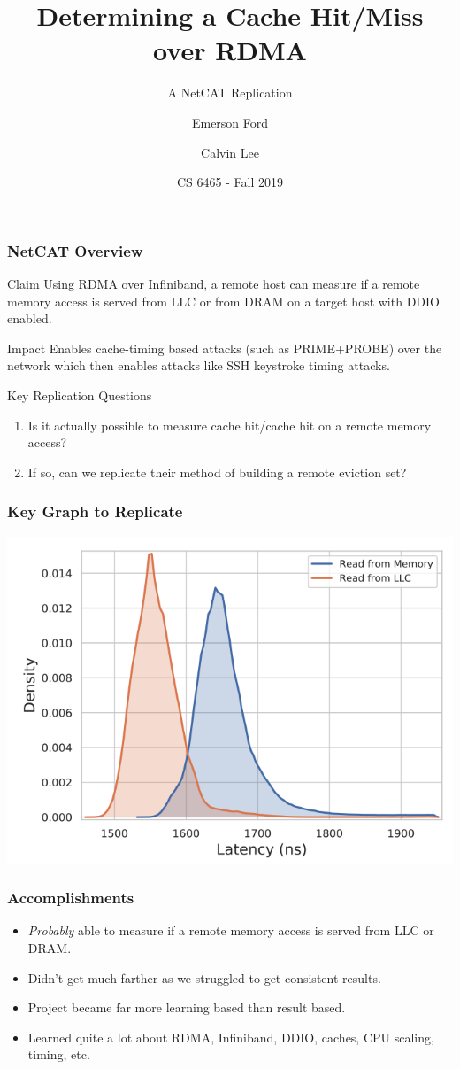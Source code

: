 \documentclass{beamer}
\title{Determining a Cache Hit/Miss over RDMA}
\subtitle{A NetCAT Replication}
\author{Emerson Ford \and Calvin Lee}
\date{CS 6465 - Fall 2019}
\begin{document}
\frame{\titlepage}

\begin{frame}[t]
 \frametitle{NetCAT Overview}
 \begin{block}{Claim}
  Using RDMA over Infiniband, a remote host can measure if a remote memory access is served from LLC or from DRAM on a target host with DDIO enabled.
 \end{block}

 \begin{block}{Impact}
  Enables cache-timing based attacks (such as PRIME+PROBE) over the network which then enables attacks like SSH keystroke timing attacks.
 \end{block}

 \begin{block}{Key Replication Questions}
  \begin{enumerate}
   \item Is it actually possible to measure cache hit/cache hit on a remote memory access?
   \item If so, can we replicate their method of building a remote eviction set?
  \end{enumerate}
 \end{block}
\end{frame}

\begin{frame}
 \frametitle{Key Graph to Replicate}
 \includegraphics[width=\textwidth]{replication_graph.png}
\end{frame}

\begin{frame}
 \frametitle{Accomplishments}

 \begin{itemize}
  \item \textit{Probably} able to measure if a remote memory access is served from LLC or DRAM.
  \item Didn't get much farther as we struggled to get consistent results.
  \item Project became far more learning based than result based.
  \item Learned quite a lot about RDMA, Infiniband, DDIO, caches, CPU scaling, timing, etc.
 \end{itemize}

\end{frame}
\end{document}
